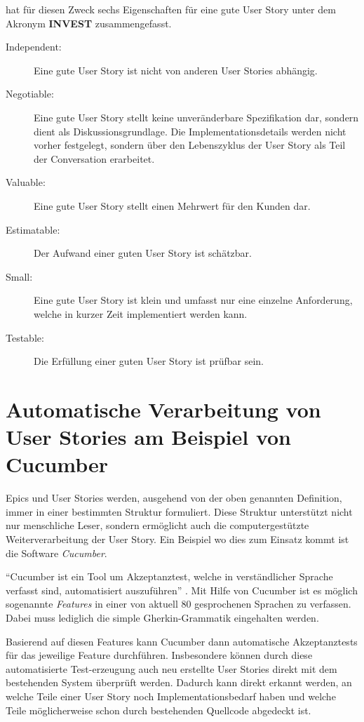 \documentclass[acmtog]{acmart}
\begin{document}
\cite{wake_invest_2003} hat für diesen Zweck sechs Eigenschaften für eine gute User Story unter dem Akronym \textbf{INVEST} zusammengefasst.
\begin{description}
	\item[Independent:] Eine gute User Story ist nicht von anderen User Stories abhängig.
	\item[Negotiable:] Eine gute User Story stellt keine unveränderbare Spezifikation dar, sondern dient als Diskussionsgrundlage.
		Die Implementationsdetails werden nicht vorher festgelegt, sondern über den Lebenszyklus der User Story als Teil der Conversation
		erarbeitet.
	\item[Valuable:] Eine gute User Story stellt einen Mehrwert für den Kunden dar.
	\item[Estimatable:] Der Aufwand einer guten User Story ist schätzbar.
	\item[Small:] Eine gute User Story ist klein und umfasst nur eine einzelne Anforderung, welche in kurzer Zeit implementiert werden kann.
	\item[Testable:] Die Erfüllung einer guten User Story ist prüfbar sein.
\end{description}

\section{Automatische Verarbeitung von User Stories am Beispiel von Cucumber}
Epics und User Stories werden, ausgehend von der oben genannten Definition, immer in einer bestimmten Struktur formuliert.
Diese Struktur unterstützt nicht nur menschliche Leser, sondern ermöglicht auch die computergestützte Weiterverarbeitung der User Story.
Ein Beispiel wo dies zum Einsatz kommt ist die Software \emph{Cucumber}.

``Cucumber ist ein Tool um Akzeptanztest, welche in verständlicher Sprache verfasst sind, automatisiert auszuführen'' \cite{the_cucumber_open_source_project_cucumber_2025}.
Mit Hilfe von Cucumber ist es möglich sogenannte \emph{Features} in einer von aktuell 80 gesprochenen Sprachen zu verfassen.
Dabei muss lediglich die simple Gherkin-Grammatik eingehalten werden.

Basierend auf diesen Features kann Cucumber dann automatische Akzeptanztests für das jeweilige Feature durchführen.
Insbesondere können durch diese automatisierte Test-erzeugung auch neu erstellte User Stories direkt mit dem bestehenden System
überprüft werden. Dadurch kann direkt erkannt werden, an welche Teile einer User Story noch Implementationsbedarf haben und welche
Teile möglicherweise schon durch bestehenden Quellcode abgedeckt ist.
\end{document}
